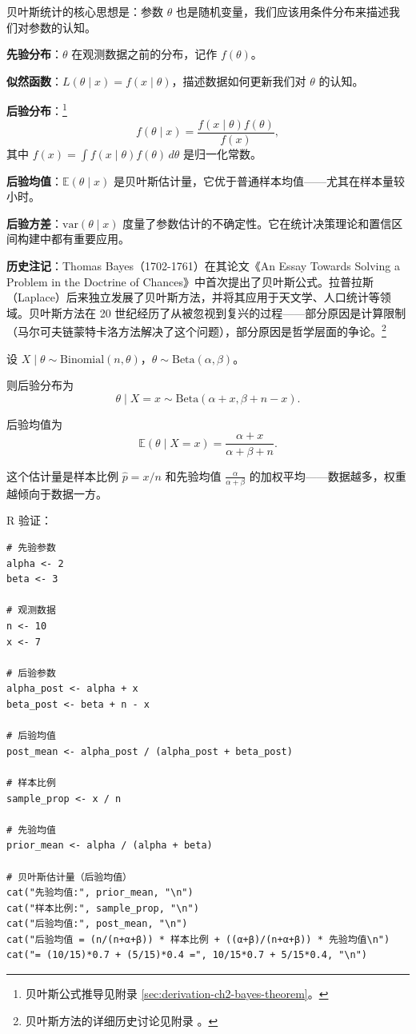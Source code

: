 贝叶斯统计的核心思想是：参数 $\theta$ 也是随机变量，我们应该用条件分布来描述我们对参数的认知。

\textbf{先验分布}：$\theta$ 在观测数据之前的分布，记作 $f(\theta)$。

\textbf{似然函数}：$L(\theta \mid x) = f(x \mid \theta)$，描述数据如何更新我们对 $\theta$ 的认知。

\textbf{后验分布}：\footnote{贝叶斯公式推导见附录 \cref{sec:derivation-ch2-bayes-theorem}。}
\[
f(\theta \mid x) = \frac{f(x \mid \theta) f(\theta)}{f(x)},
\]
其中 $f(x) = \int f(x \mid \theta) f(\theta) \, d\theta$ 是归一化常数。

\textbf{后验均值}：$\mathbb{E}(\theta \mid x)$ 是贝叶斯估计量，它优于普通样本均值——尤其在样本量较小时。

\textbf{后验方差}：$\text{var}(\theta \mid x)$ 度量了参数估计的不确定性。它在统计决策理论和置信区间构建中都有重要应用。

\textbf{历史注记}：Thomas Bayes（1702-1761）在其论文《An Essay Towards Solving a Problem in the Doctrine of Chances》中首次提出了贝叶斯公式。拉普拉斯（Laplace）后来独立发展了贝叶斯方法，并将其应用于天文学、人口统计等领域。贝叶斯方法在 20 世纪经历了从被忽视到复兴的过程——部分原因是计算限制（马尔可夫链蒙特卡洛方法解决了这个问题），部分原因是哲学层面的争论。\footnote{贝叶斯方法的详细历史讨论见附录 。}

\begin{example}\label{ex:beta-binomial-conjugate-ch2}
设 $X \mid \theta \sim \text{Binomial}(n, \theta)$，$\theta \sim \text{Beta}(\alpha, \beta)$。

则后验分布为
\[
\theta \mid X = x \sim \text{Beta}(\alpha + x, \beta + n - x).
\]

后验均值为
\[
\mathbb{E}(\theta \mid X = x) = \frac{\alpha + x}{\alpha + \beta + n}.
\]

这个估计量是样本比例 $\hat{p} = x/n$ 和先验均值 $\frac{\alpha}{\alpha+\beta}$ 的加权平均——数据越多，权重越倾向于数据一方。

R 验证：
\begin{verbatim}
# 先验参数
alpha <- 2
beta <- 3

# 观测数据
n <- 10
x <- 7

# 后验参数
alpha_post <- alpha + x
beta_post <- beta + n - x

# 后验均值
post_mean <- alpha_post / (alpha_post + beta_post)

# 样本比例
sample_prop <- x / n

# 先验均值
prior_mean <- alpha / (alpha + beta)

# 贝叶斯估计量（后验均值）
cat("先验均值:", prior_mean, "\n")
cat("样本比例:", sample_prop, "\n")
cat("后验均值:", post_mean, "\n")
cat("后验均值 = (n/(n+α+β)) * 样本比例 + ((α+β)/(n+α+β)) * 先验均值\n")
cat("= (10/15)*0.7 + (5/15)*0.4 =", 10/15*0.7 + 5/15*0.4, "\n")
\end{verbatim}
\end{example}
